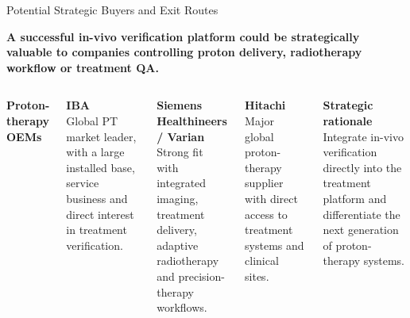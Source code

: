 \documentclass[aspectratio=169,11pt]{beamer}
\begin{document}
\begin{frame}{Potential Strategic Buyers and Exit Routes}

\vspace{0.05cm}

\begin{center}
\scriptsize\bfseries
A successful in-vivo verification platform could be strategically valuable
to companies controlling proton delivery, radiotherapy workflow or treatment QA.
\end{center}

\vspace{0.25cm}

\begin{columns}[T,onlytextwidth]


\scriptsize\bfseries\color{PTblue}
Proton-therapy OEMs

\vspace{0.12cm}

\tiny\color{black}

\textbf{IBA}\\

Global PT market leader, with a large installed base,
service business and direct interest in treatment verification.

\vspace{0.15cm}

\textbf{Siemens Healthineers / Varian}\\
Strong fit with integrated imaging, treatment delivery,
adaptive radiotherapy and precision-therapy workflows.

\vspace{0.15cm}

\textbf{Hitachi}\\
Major global proton-therapy supplier with direct access
to treatment systems and clinical sites.

\vspace{0.25cm}

\textbf{Strategic rationale}\\
Integrate in-vivo verification directly into the treatment platform
and differentiate the next generation of proton-therapy systems.




\end{columns}
\end{frame}
\end{document}
